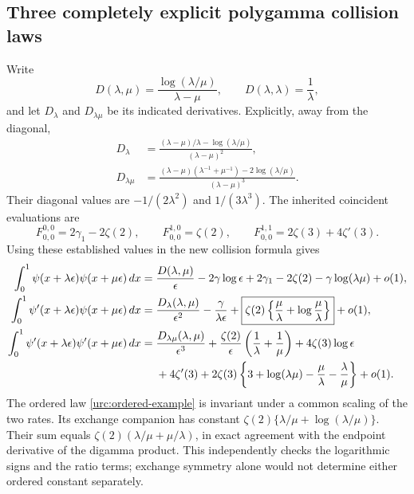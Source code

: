 \documentclass[11pt,a4paper]{article}
\theoremstyle{definition}
\theoremstyle{remark}
\numberwithin{equation}{section}
\begin{document}
\subsection{Three completely explicit polygamma collision laws}

Write
\begin{equation}\label{urc:D}
 D(\lambda,\mu)=\frac{\log(\lambda/\mu)}{\lambda-\mu},
 \qquad D(\lambda,\lambda)=\frac1\lambda,
\end{equation}
and let $D_\lambda$ and $D_{\lambda\mu}$ be its indicated
derivatives. Explicitly, away from the diagonal,
\begin{align*}
 D_\lambda&=\frac{(\lambda-\mu)/\lambda-\log(\lambda/\mu)}
                  {(\lambda-\mu)^2},\\
 D_{\lambda\mu}
 &=\frac{(\lambda-\mu)(\lambda^{-1}+\mu^{-1})
                       -2\log(\lambda/\mu)}{(\lambda-\mu)^3}.
\end{align*}
Their diagonal values are $-1/(2\lambda^2)$ and
$1/(3\lambda^3)$. The inherited coincident evaluations \cite{LatticeIncoming} are
\[
 F_{0,0}^{0,0}=2\gamma_1-2\zeta(2),\qquad
 F_{0,0}^{1,0}=\zeta(2),\qquad
 F_{0,0}^{1,1}=2\zeta(3)+4\zeta'(3).
\]
Using these established values in the new collision formula gives
\begin{align}
 \int_0^1\psi(x+\lambda\epsilon)\psi(x+\mu\epsilon)\,dx
 ={}&\frac{D(\lambda,\mu)}\epsilon-2\gamma\log\epsilon
       +2\gamma_1-2\zeta(2)-\gamma\log(\lambda\mu)+o(1),
 \label{urc:digamma-example}\\
 \int_0^1\psi'(x+\lambda\epsilon)\psi(x+\mu\epsilon)\,dx
 ={}&\frac{D_\lambda(\lambda,\mu)}{\epsilon^2}
       -\frac{\gamma}{\lambda\epsilon}
       +\boxed{\zeta(2)\left\{\frac\mu\lambda+
                               \log\frac\mu\lambda\right\}}
       +o(1),
 \label{urc:ordered-example}\\
 \int_0^1\psi'(x+\lambda\epsilon)\psi'(x+\mu\epsilon)\,dx
 ={}&\frac{D_{\lambda\mu}(\lambda,\mu)}{\epsilon^3}
       +\frac{\zeta(2)}\epsilon
                       \left(\frac1\lambda+\frac1\mu\right)
       +4\zeta(3)\log\epsilon\notag\\
 &+4\zeta'(3)+2\zeta(3)
       \left\{3+\log(\lambda\mu)-\frac\mu\lambda-
                                      \frac\lambda\mu\right\}+o(1).
 \label{urc:trigamma-example}
\end{align}
The ordered law \eqref{urc:ordered-example} is invariant under a
common scaling of the two rates. Its exchange companion has
constant $\zeta(2)\{\lambda/\mu+\log(\lambda/\mu)\}$. Their
sum equals $\zeta(2)(\lambda/\mu+\mu/\lambda)$, in exact
agreement with the endpoint derivative of the digamma product.
This independently checks the logarithmic signs and the ratio
terms; exchange symmetry alone would not determine either ordered
constant separately.
\end{document}

